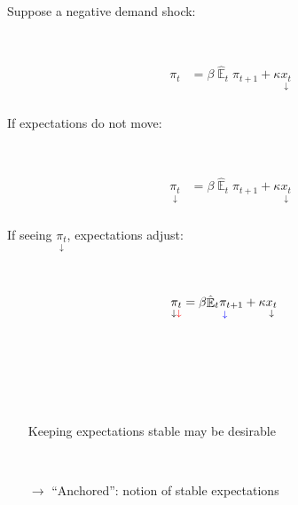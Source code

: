 \documentclass{beamer}
\DeclareMathOperator{\E}{\mathbb{E}}
\begin{document}
\begin{frame}
	\frametitle{}

Suppose a negative demand shock:

\

\begin{align*}
\pi_t & = \beta \hat{\E}_t\pi_{t+1} + \kappa \underset{\downarrow}{x_t} 
\end{align*}




\end{frame}

\begin{frame}
	\frametitle{}

If expectations do not move:

\

\begin{align*}
\underset{\downarrow}{\pi_t} & = \beta \hat{\E}_t\pi_{t+1}+ \kappa \underset{\downarrow}{x_t} 
\end{align*}




\end{frame}

\begin{frame}
	\frametitle{}

If seeing $\underset{\downarrow}{\pi_t}$, expectations adjust:

\

\begin{align*}
\underset{\downarrow \color{red}{\downarrow}}{\pi_t} & = \beta \underset{\color{blue}{\downarrow}}{\hat{\E}_t\pi_{t+1}}+ \kappa \underset{\downarrow}{x_t} 
\end{align*}

\

\

\

\begin{itemize}
\item[] Keeping expectations stable may be desirable

\

\item[$\rightarrow$]  ``Anchored'': notion of stable expectations

\


\

\end{itemize}

\


\end{frame}
\end{document}

